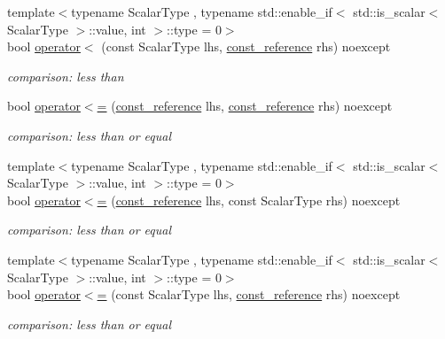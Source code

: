 \begin{DoxyCompactItemize}
{\footnotesize template$<$typename Scalar\+Type , typename std\+::enable\+\_\+if$<$ std\+::is\+\_\+scalar$<$ Scalar\+Type $>$\+::value, int $>$\+::type  = 0$>$ }\\bool \hyperlink{classnlohmann_1_1basic__json_abed3e9b4ab75f5bcbd3cd20f5af5cdab}{operator$<$} (const Scalar\+Type lhs, \hyperlink{classnlohmann_1_1basic__json_a4057c5425f4faacfe39a8046871786ca}{const\+\_\+reference} rhs) noexcept
\begin{DoxyCompactList}\small\item\em comparison\+: less than \end{DoxyCompactList}\item 
bool \hyperlink{classnlohmann_1_1basic__json_a5c8bb5200f5eac10d31e26be46e5b1ac}{operator$<$=} (\hyperlink{classnlohmann_1_1basic__json_a4057c5425f4faacfe39a8046871786ca}{const\+\_\+reference} lhs, \hyperlink{classnlohmann_1_1basic__json_a4057c5425f4faacfe39a8046871786ca}{const\+\_\+reference} rhs) noexcept
\begin{DoxyCompactList}\small\item\em comparison\+: less than or equal \end{DoxyCompactList}\item 
{\footnotesize template$<$typename Scalar\+Type , typename std\+::enable\+\_\+if$<$ std\+::is\+\_\+scalar$<$ Scalar\+Type $>$\+::value, int $>$\+::type  = 0$>$ }\\bool \hyperlink{classnlohmann_1_1basic__json_a7e368211047f725f333696aefdf39ffd}{operator$<$=} (\hyperlink{classnlohmann_1_1basic__json_a4057c5425f4faacfe39a8046871786ca}{const\+\_\+reference} lhs, const Scalar\+Type rhs) noexcept
\begin{DoxyCompactList}\small\item\em comparison\+: less than or equal \end{DoxyCompactList}\item 
{\footnotesize template$<$typename Scalar\+Type , typename std\+::enable\+\_\+if$<$ std\+::is\+\_\+scalar$<$ Scalar\+Type $>$\+::value, int $>$\+::type  = 0$>$ }\\bool \hyperlink{classnlohmann_1_1basic__json_ad73f88f70fe5acfa521750a8cd710026}{operator$<$=} (const Scalar\+Type lhs, \hyperlink{classnlohmann_1_1basic__json_a4057c5425f4faacfe39a8046871786ca}{const\+\_\+reference} rhs) noexcept
\begin{DoxyCompactList}\small\item\em comparison\+: less than or equal \end{DoxyCompactList}\item 

\end{DoxyCompactItemize}
